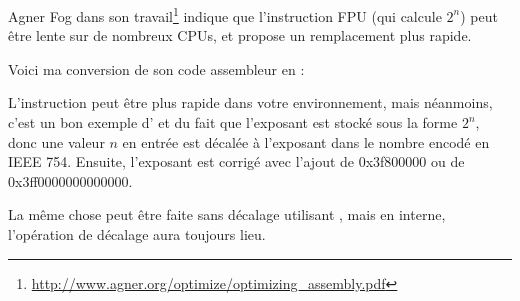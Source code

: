 
Agner Fog dans son travail\footnote{\url{http://www.agner.org/optimize/optimizing_assembly.pdf}}
indique que l'instruction \ac{FPU}  (qui calcule $2^n$) peut être lente
sur de nombreux CPUs, et propose un remplacement plus rapide.

Voici ma conversion de son code assembleur en \CCpp:



L'instruction  peut être plus rapide dans votre environnement, mais néanmoins,
c'est un bon exemple d' et du fait que l'exposant est stocké sous la forme
$2^n$, donc une valeur $n$ en entrée est décalée à l'exposant dans le nombre encodé
en IEEE 754.
Ensuite, l'exposant est corrigé avec l'ajout de 0x3f800000 ou de 0x3ff0000000000000.

La même chose peut être faite sans décalage utilisant , mais en interne,
l'opération de décalage aura toujours lieu.

